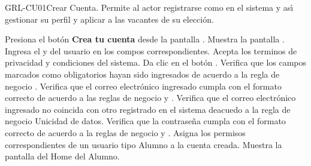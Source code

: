 \begin{UseCase}{GRL-CU01}{Crear Cuenta.}{
	Permite al actor registrarse como en el sistema y ası́ gestionar su perfil y aplicar a las vacantes
	de su elección.
}
	  

\end{UseCase}

\begin{UCtrayectoria}
	\UCpaso [\UCactor] Presiona el botón \textbf{Crea tu cuenta} desde la pantalla .
    \UCpaso [\UCsist] Muestra la pantalla .
	\UCpaso [\UCactor] Ingresa el  y  del usuario en los compos correspondientes.\label{cu01-grl}
	\UCpaso [\UCactor] Acepta los terminos de privacidad y condiciones del sistema.
	\UCpaso [\UCactor] Da clic en el botón . 
    \UCpaso [\UCsist] Verifica que los campos marcados como obligatorios hayan sido ingresados de acuerdo a la
	regla de negocio .
	\UCpaso [\UCsist] Verifica que el correo electrónico ingresado cumpla con el formato correcto de acuerdo a las reglas de negocio   y  .
	\UCpaso [\UCsist] Verifica que el correo electrónico ingresado no coincida con otro registrado en el sistema deacuedo a la regla de negocio   Unicidad de datos.
	\UCpaso [\UCsist] Verifica que la contraseña cumpla con el formato correcto de acuerdo a la reglas de negocio  y  .
	\UCpaso [\UCsist] Asigna los permisos correspondientes de un usuario tipo Alumno a la cuenta creada.
    \UCpaso [\UCsist] Muestra la pantalla del Home del Alumno.
\end{UCtrayectoria}

